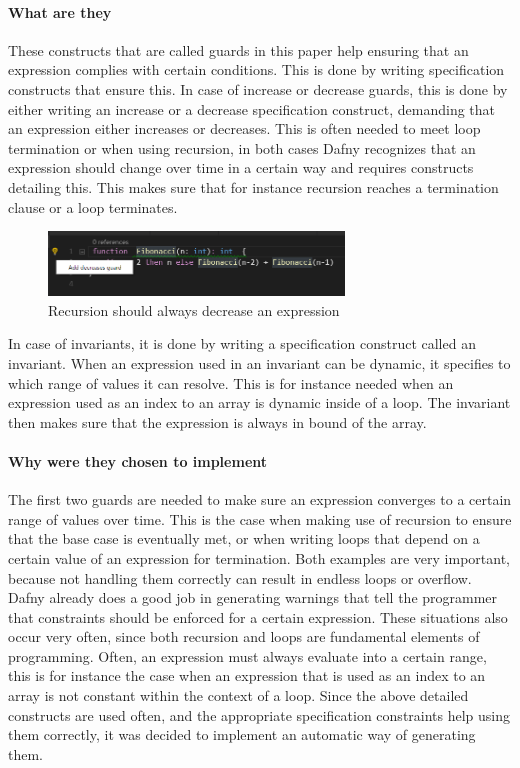 \paragraph{What are they}
These constructs that are called guards in this paper help ensuring that an expression complies with certain conditions. This is done by writing specification constructs that ensure this. 
\newline
In case of increase or decrease guards, this is done by either writing an increase or a decrease specification construct, demanding that an expression either increases or decreases. This is often needed to meet loop termination or when using recursion, in both cases Dafny recognizes that an expression should change over time in a certain way and requires constructs detailing this. This makes sure that for instance recursion reaches a termination clause or a loop terminates. \newline
\begin{figure}[H]
	\centering
	\includegraphics[width=0.7\textwidth]{img/decreaseGuard}
	\caption{Recursion should always decrease an expression}
	\label{fig:dfdecreaseguard}
\end{figure}
In case of invariants, it is done by writing a specification construct called an invariant. When an expression used in an invariant can be dynamic, it specifies to which range of values it can resolve. 
This is for instance needed when an expression used as an index to an array is dynamic inside of a loop. The invariant then makes sure that the expression is always in bound of the array. 
\paragraph{Why were they chosen to implement}
The first two guards are needed to  make sure an expression converges to a certain range of values over time. This is the case when making use of recursion to ensure that the base case is eventually met, or when writing loops that depend on a certain value of an expression for termination. Both examples are very important, because not handling them correctly can result in endless loops or overflow. Dafny already does a good job in generating warnings that tell the programmer that constraints should be enforced for a certain expression. These situations also occur very often, since both recursion and loops are fundamental elements of programming.\newline
Often, an expression must always evaluate into a certain range, this is for instance the case when an expression that is used as an index to an array is not constant within the context of a loop. \newline
Since the above detailed constructs are used often, and the appropriate specification constraints help using them correctly, it was decided to implement an automatic way of generating them. 
